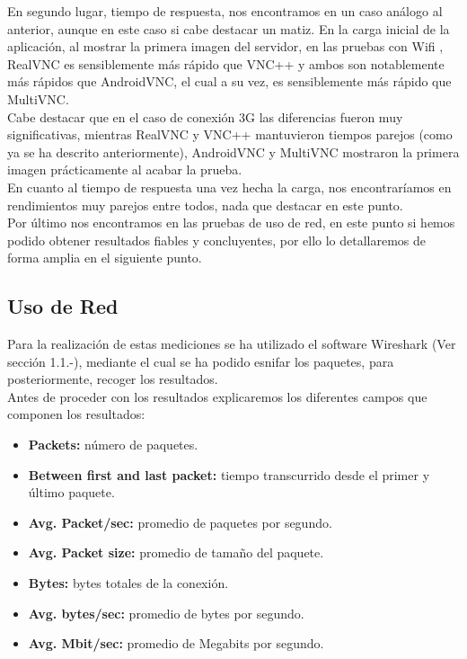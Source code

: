 En segundo lugar, tiempo de respuesta, nos encontramos en un caso análogo al anterior, aunque en este caso si cabe destacar un matiz. En la carga inicial de la aplicación, al mostrar la primera imagen del servidor, en las pruebas con Wifi , RealVNC es sensiblemente más rápido que VNC++ y ambos son notablemente más rápidos que AndroidVNC, el cual a su vez, es sensiblemente más rápido que MultiVNC.\\

Cabe destacar que en el caso de conexión 3G las diferencias fueron muy significativas, mientras RealVNC y VNC++ mantuvieron tiempos parejos (como ya se ha descrito anteriormente), AndroidVNC y MultiVNC mostraron la primera imagen prácticamente al acabar la prueba.\\

En cuanto al tiempo de respuesta una vez hecha la carga, nos encontraríamos en rendimientos muy parejos entre todos, nada que destacar en este punto.\\

Por último nos encontramos en las pruebas de uso de red, en este punto si hemos podido obtener resultados fiables y concluyentes, por ello lo detallaremos de forma amplia en el siguiente punto.

\subsection{Uso de Red}

Para la realización de estas mediciones se ha utilizado el software Wireshark (Ver sección 1.1.-), mediante el cual se ha podido esnifar los paquetes, para posteriormente, recoger los resultados.\\

Antes de proceder con los resultados explicaremos los diferentes campos que componen los resultados:
\begin{itemize}
\item \textbf{Packets:} número de paquetes.
\item \textbf{Between first and last packet:} tiempo transcurrido desde el primer y último paquete.
\item \textbf{Avg. Packet/sec:} promedio de paquetes por segundo.
\item \textbf{Avg. Packet size:} promedio de tamaño del paquete.
\item \textbf{Bytes:} bytes totales de la conexión.
\item \textbf{Avg. bytes/sec:} promedio de bytes por segundo.
\item \textbf{Avg. Mbit/sec:} promedio de Megabits por segundo.
\end{itemize}

